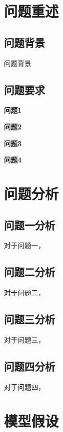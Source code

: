 \documentclass[withoutpreface,bwprint]{cumcmthesis}
\begin{document}

\section{问题重述}
\subsection{问题背景}
问题背景


\subsection{问题要求}

\textbf{问题1}  

\textbf{问题2}  

\textbf{问题3} 

\textbf{问题4}  


\section{问题分析}
\subsection{问题一分析}
对于问题一，

\subsection{问题二分析}	
对于问题二，

\subsection{问题三分析}
对于问题三，

\subsection{问题四分析}
对于问题四，


\section{模型假设}
\end{document}
